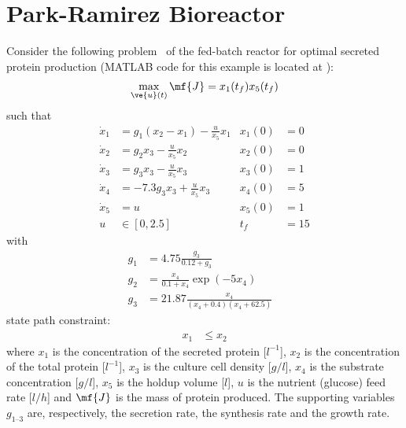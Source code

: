 \section{Park-Ramirez Bioreactor}
\label{sec:prob_pr_bior}

Consider the following problem~\citep{PR_bior} of the fed-batch
reactor for optimal secreted protein production (MATLAB code for this
example is located at ):
\begin{gather}
\max_{\ve{u}(t)} \mf{J} = x_{1}(t_f)x_{5}(t_f) \label{eq:bior}
\end{gather}
such that
\begin{align}
\dot{x}_1  & = g_{1}(x_{2}-x_{1})-\frac{u}{x_{5}}x_{1} & x_{1}(0) & = 0\\
\dot{x}_2  & = g_{2}x_{3}-\frac{u}{x_{5}}x_{2} & x_{2}(0) & = 0\\
\dot{x}_3  & = g_{3}x_{3}-\frac{u}{x_{5}}x_{3} & x_{3}(0) & = 1 \\
\dot{x}_4  & = -7.3g_{3}x_{3}+\frac{u}{x_{5}}x_{3} & x_{4}(0) & = 5 \\
\dot{x}_5  & = u & x_{5}(0) & = 1 \\
u  & \in [0,2.5] & t_f & = 15
\end{align}
with
\begin{align}
g_{1}  & =  4.75\frac{g_{3}}{0.12+g_{3}} &\\
g_{2}  & = \frac{x_{4}}{0.1+x_{4}}\exp(-5x_{4}) &\\
g_{3}  & = 21.87\frac{x_{4}}{(x_{4}+0.4)(x_{4}+62.5)} &
\end{align}
state path constraint:
\begin{align}
x_{1} & \leq x_{2}
\end{align}
where $x_{1}$ is the concentration of the secreted protein [$l^{-1}$], $x_{2}$ is the concentration of the total protein [$l^{-1}$], $x_{3}$ is the culture cell density [$g/l$], $x_{4}$ is the substrate concentration [$g/l$], $x_{5}$ is the holdup volume [$l$], $u$ is the nutrient (glucose) feed rate [$l/h$] and $\mf{J}$ is the mass of protein produced. The supporting variables $g_{1\text{--}3}$ are, respectively, the secretion rate, the synthesis rate and the growth rate.


